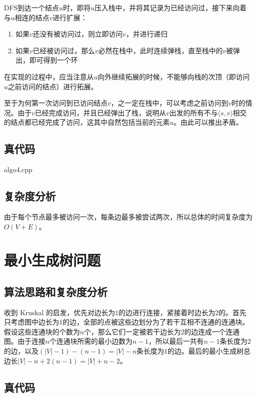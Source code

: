 \documentclass[UTF8]{ctexart}
\begin{document}
        DFS到达一个结点$u$时，即将$u$压入栈中，并将其记录为已经访问过，接下来向着与$u$相连的结点$v$进行扩展：
        \begin{enumerate}
            \item 如果$v$还没有被访问过，则立即访问$v$，并进行递归
            \item 如果$v$已经被访问过，那么$v$必然在栈中，此时连续弹栈，直至栈中的$v$被弹出，即可得到一个环
        \end{enumerate}

        在实现的过程中，应当注意从$u$向外继续拓展的时候，不能够向栈的次顶（即访问$u$之前访问的结点）进行拓展。

        至于为何第一次访问到已访问结点$v$，之一定在栈中，可以考虑之前访问到$v$时的情况。由于$v$已经完成访问，并且已经弹出了栈，说明从$v$出发的所有不与$\langle s, v\rangle$相交的结点都已经完成了访问，这其中自然包括当前的元素$u$。由此可以推出矛盾。

    \subsection*{真代码}
         {algo4.cpp}
        
    \subsection*{复杂度分析}
        由于每个节点最多被访问一次，每条边最多被尝试两次，所以总体的时间复杂度为$O(V+E)$。

\section{最小生成树问题}
    \subsection*{算法思路和复杂度分析}
        收到 Kruskal 的启发，优先对边长为$1$的边进行连接，紧接着时边长为$2$的。首先只考虑图中边长为$1$的边，全部的点被这些边划分为了若干互相不连通的连通块。假设这些连通块的个数为$n$个，那么它们一定被若干边长为$2$的边连成一个连通图。由于连接$n$个连通块所需的最小边数为$n-1$，所以最后一共有$n-1$条长度为$2$的边，以及$(|V|-1)-(n-1)=|V|-n$条长度为$1$的边。最后的最小生成树总边长$|V|-n+2(n-1)=|V|+n-2$。

    \subsection*{真代码}
        
\end{document}
